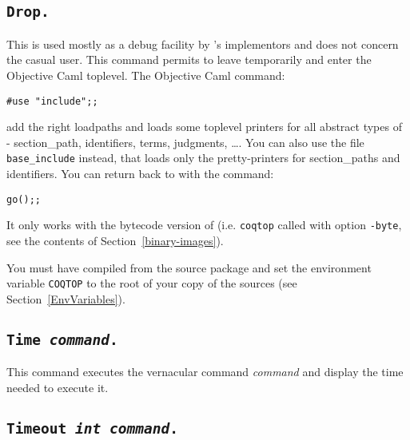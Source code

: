 \subsection[\tt Drop.]{\tt Drop.\label{Drop}}

This is used mostly as a debug facility by \Coq's implementors
and does not concern the casual user.
This command permits to leave {\Coq} temporarily and enter the
Objective Caml toplevel. The Objective Caml command:

\begin{flushleft}
\begin{verbatim}
#use "include";;
\end{verbatim}
\end{flushleft}

\noindent add the right loadpaths and loads some toplevel printers for
all abstract types of \Coq - section\_path, identifiers, terms, judgments,
\dots. You can also use the file \texttt{base\_include} instead,
that loads only the pretty-printers for section\_paths and
identifiers.
You can return back to \Coq{} with the command: 

\begin{flushleft}
\begin{verbatim}
go();;
\end{verbatim}
\end{flushleft}

\begin{Warnings}
\item It only works with the bytecode version of {\Coq} (i.e. {\tt coqtop} called with option {\tt -byte}, see the contents of Section~\ref{binary-images}).
\item You must have compiled {\Coq} from the source package and set the
  environment variable \texttt{COQTOP} to the root of your copy of the sources (see Section~\ref{EnvVariables}).
\end{Warnings}

\subsection[\tt Time \textrm{\textsl{command}}.]{\tt Time \textrm{\textsl{command}}.
\label{time}}
This command executes the vernacular command \textrm{\textsl{command}}
and display the time needed to execute it.


\subsection[\tt Timeout \textrm{\textsl{int}} \textrm{\textsl{command}}.]{\tt Timeout \textrm{\textsl{int}} \textrm{\textsl{command}}.
\label{timeout}}

